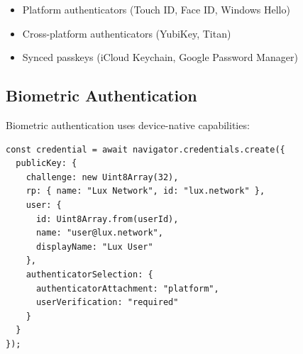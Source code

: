 \begin{itemize}
    \item Platform authenticators (Touch ID, Face ID, Windows Hello)
    \item Cross-platform authenticators (YubiKey, Titan)
    \item Synced passkeys (iCloud Keychain, Google Password Manager)
\end{itemize}

\subsection{Biometric Authentication}

Biometric authentication uses device-native capabilities:

\begin{lstlisting}[language=Solidity]
const credential = await navigator.credentials.create({
  publicKey: {
    challenge: new Uint8Array(32),
    rp: { name: "Lux Network", id: "lux.network" },
    user: {
      id: Uint8Array.from(userId),
      name: "user@lux.network",
      displayName: "Lux User"
    },
    authenticatorSelection: {
      authenticatorAttachment: "platform",
      userVerification: "required"
    }
  }
});
\end{lstlisting}

